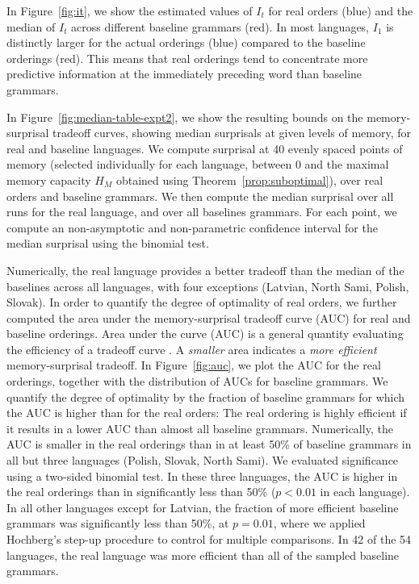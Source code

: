 In Figure~\ref{fig:it}, we show the estimated values of $I_t$ for real orders (blue) and the median of $I_t$ across different baseline grammars (red).
In most languages, $I_1$ is distinctly larger for the actual orderings (blue) compared to the baseline orderings (red). This means that real orderings tend to concentrate more predictive information at the immediately preceding word than baseline grammars.

In Figure~\ref{fig:median-table-expt2}, we show the resulting bounds on the memory-surprisal tradeoff curves, showing median surprisals at given levels of memory, for real and baseline languages.
We compute surprisal at 40 evenly spaced points of memory (selected individually for each language, between 0 and the maximal memory capacity $H_M$ obtained using Theorem~\ref{prop:suboptimal}), over real orders and baseline grammars.
We then compute the median surprisal over all runs for the real language, and over all baselines grammars.
For each point, we compute an non-asymptotic and non-parametric confidence interval for the median surprisal using the binomial test.

Numerically, the real language provides a better tradeoff than the median of the baselines across all languages, with four exceptions (Latvian, North Sami, Polish, Slovak). In order to quantify the degree of optimality of real orders, we further computed the area under the memory-surprisal tradeoff curve (AUC) for real and baseline orderings.
Area under the curve (AUC) is a general quantity evaluating the efficiency of a tradeoff curve \citep{bradley1997use}.
A \emph{smaller} area indicates a \emph{more efficient} memory-surprisal tradeoff.
In Figure~\ref{fig:auc}, we plot the AUC for the real orderings, together with the distribution of AUCs for baseline grammars.
We quantify the degree of optimality by the fraction of baseline grammars for which the AUC is higher than for the real orders:
The real ordering is highly efficient if it results in a lower AUC than almost all baseline grammars.
Numerically, the AUC is smaller in the real orderings than in at least 50\% of baseline grammars in all but three languages (Polish, Slovak, North Sami).
We evaluated significance using a two-sided binomial test.
In these three languages, the AUC is higher in the real orderings than in significantly less than 50\% ($p < 0.01$ in each language).
In all other languages except for Latvian, the fraction of more efficient baseline grammars was significantly less than 50\%, at $p=0.01$, where we applied Hochberg's step-up procedure \citep{hochberg1988sharper} to control for multiple comparisons.
In 42 of the 54 languages, the real language was more efficient than all of the sampled baseline grammars. %



